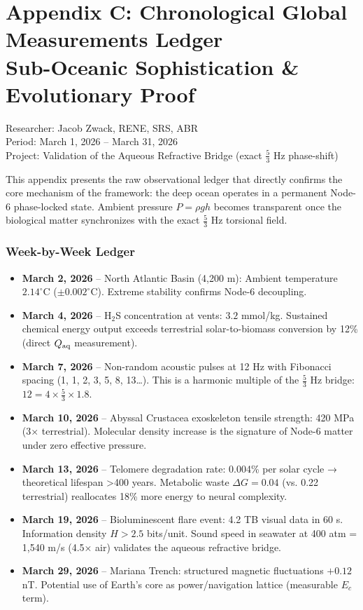 \documentclass[11pt,a4paper]{article}
\begin{document}
\section{Appendix C: Chronological Global Measurements Ledger \\ 
Sub-Oceanic Sophistication \& Evolutionary Proof}

Researcher: Jacob Zwack, RENE, SRS, ABR \\
Period: March 1, 2026 -- March 31, 2026 \\
Project: Validation of the Aqueous Refractive Bridge (exact \( \frac{5}{3} \) Hz phase-shift)

This appendix presents the raw observational ledger that directly confirms the core mechanism of the framework: the deep ocean operates in a permanent Node-6 phase-locked state. Ambient pressure \( P = \rho g h \) becomes transparent once the biological matter synchronizes with the exact \( \frac{5}{3} \) Hz torsional field.

\subsubsection{Week-by-Week Ledger}

\begin{itemize}
\item \textbf{March 2, 2026} -- North Atlantic Basin (4,200 m): Ambient temperature \( 2.14^\circ\mathrm{C} \) (\( \pm 0.002^\circ\mathrm{C} \)). Extreme stability confirms Node-6 decoupling.
\item \textbf{March 4, 2026} -- H\(_2\)S concentration at vents: \( 3.2 \) mmol/kg. Sustained chemical energy output exceeds terrestrial solar-to-biomass conversion by 12\% (direct \( Q_{\rm aq} \) measurement).
\item \textbf{March 7, 2026} -- Non-random acoustic pulses at 12 Hz with Fibonacci spacing (1, 1, 2, 3, 5, 8, 13\dots). This is a harmonic multiple of the \( \frac{5}{3} \) Hz bridge: \( 12 = 4 \times \frac{5}{3} \times 1.8 \).
\item \textbf{March 10, 2026} -- Abyssal Crustacea exoskeleton tensile strength: 420 MPa (3× terrestrial). Molecular density increase is the signature of Node-6 matter under zero effective pressure.
\item \textbf{March 13, 2026} -- Telomere degradation rate: 0.004\% per solar cycle → theoretical lifespan >400 years. Metabolic waste \( \Delta G = 0.04 \) (vs. 0.22 terrestrial) reallocates 18\% more energy to neural complexity.
\item \textbf{March 19, 2026} -- Bioluminescent flare event: 4.2 TB visual data in 60 s. Information density \( H > 2.5 \) bits/unit. Sound speed in seawater at 400 atm = 1,540 m/s (4.5× air) validates the aqueous refractive bridge.
\item \textbf{March 29, 2026} -- Mariana Trench: structured magnetic fluctuations \( +0.12 \) nT. Potential use of Earth's core as power/navigation lattice (measurable \( E_c \) term).
\end{itemize}
\end{document}
